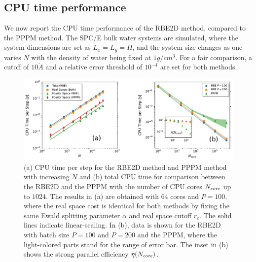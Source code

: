 \subsection{CPU time performance}
We now report the CPU time performance of the RBE2D method, compared to the PPPM method. 
The SPC/E bulk water systems are simulated, where
the system dimensions are set as $L_x=L_y=H$,  and the system size changes as one varies $N$ with the density of water being fixed at $1g/cm^3$. For a fair comparison, a cutoff of $10\mathring{A}$ and a relative error threshold of $10^{-4}$ are set for both methods.


\begin{figure}[ht!]
\centering	\includegraphics[width=0.9\linewidth]{figs/cpu_time_nonsub.pdf}
	\caption{
     (a) CPU time per step for the RBE2D method  {and PPPM method} with increasing $N$ and (b) total CPU time for comparison between the RBE2D and the PPPM with the number of CPU cores $N_{\emph{core}}$ up to $1024$.  {The results in (a) are obtained} with $64$ cores and $P=100$, where  {the real space cost is identical for both methods by fixing the same Ewald splitting parameter $\alpha$ and real space cutoff $r_c$.}
     The solid lines indicate linear-scaling. 
     In (b), data   {is} shown for the RBE2D with batch size $P=100$ and $P=200$ and the PPPM, where the light-colored parts stand for the range of error bar. The inset in (b) shows the   {strong parallel efficiency} $\eta(N_{\emph{core}})$.}
	\label{fig:Time}
\end{figure}

